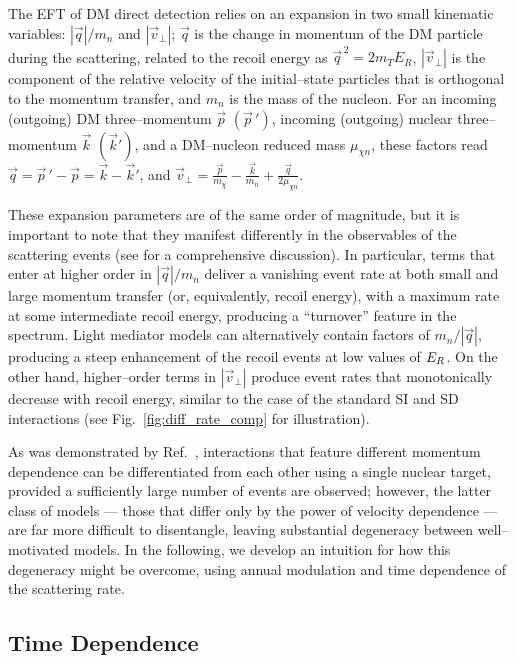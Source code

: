 \documentclass[11pt, a4paper]{article}
\newcommand{\Fig}[1]{Fig.~\ref{#1}} \newcommand{\Figs}[2]{Figs.~\ref{#1} and \ref{#2}}
\begin{document}
The EFT of DM direct detection \cite{Fitzpatrick:2012ix, Anand:2013yka} relies on an expansion in two small kinematic variables: $|\vec q|/m_n$ and $|\vec v_\perp|$; $\vec q$ is the change in momentum of the DM particle during the scattering, related to the recoil energy as $\vec{q}^{\, 2} =2m_TE_R$, $|\vec v_\perp|$ is the component of the relative velocity of the initial--state particles that is orthogonal to the momentum transfer, and $m_n$ is the mass of the nucleon. For an incoming (outgoing) DM three--momentum $\vec p$ $(\vec p\,')$, incoming (outgoing) nuclear three--momentum $\vec k$ $(\vec k')$, and a DM--nucleon reduced mass $\mu_{\chi n}$, these factors read $\vec q=\vec p\,'-\vec p=\vec k-\vec k'$, and $\vec v_\perp=\frac{\vec p}{m_\chi}-\frac{\vec k}{m_n}+\frac{\vec q}{2\mu_{\chi n}}$. 


These expansion parameters are of the same order of magnitude, but it is important to note that they manifest differently in the observables of the scattering events (see \eg \cite{Gluscevic:2015sqa} for a comprehensive discussion). In particular, terms that enter at higher order in $|\vec q|/m_n$ deliver a vanishing event rate at both small and large momentum transfer (or, equivalently, recoil energy), with a maximum rate at some intermediate recoil energy, producing a ``turnover'' feature in the spectrum. Light mediator models can alternatively contain factors of $m_n/|\vec q|$, producing a steep enhancement of the recoil events at low values of $E_R$. On the other hand, higher--order terms in $| \vec v_\perp|$ produce event rates that monotonically decrease with recoil energy, similar to the case of the standard SI and SD interactions (see \Fig{fig:diff_rate_comp} for illustration).

As was demonstrated by Ref.~\cite{Gluscevic:2015sqa}, interactions that feature different momentum dependence can be differentiated from each other using a single nuclear target, provided a sufficiently large number of events are observed; however, the latter class of models --- those that differ only by the power of velocity dependence --- are far more difficult to disentangle, leaving substantial degeneracy between well--motivated models. In the following, we develop an intuition for how this degeneracy might be overcome, using annual modulation and time dependence of the scattering rate.

\subsection{Time Dependence}
\label{subsec:time}
\end{document}
